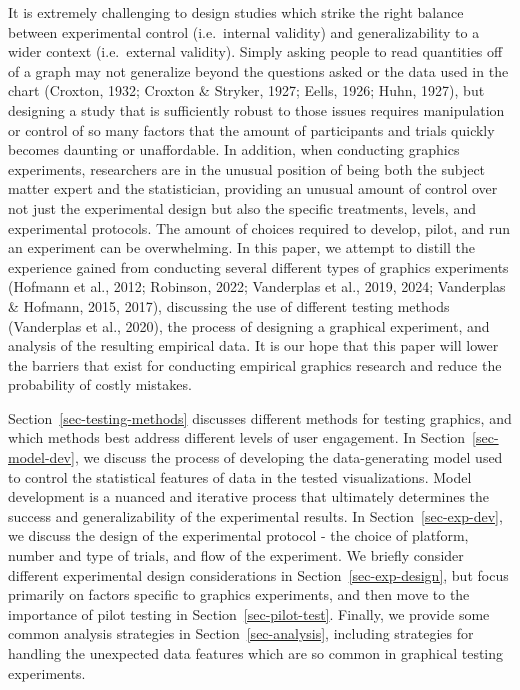\documentclass[
  10pt,
  letterpaper,
  DIV=11,
  numbers=noendperiod]{scrartcl}
\begin{document}
It is extremely challenging to design studies which strike the right
balance between experimental control (i.e.~internal validity) and
generalizability to a wider context (i.e.~external validity). Simply
asking people to read quantities off of a graph may not generalize
beyond the questions asked or the data used in the chart (Croxton, 1932;
Croxton \& Stryker, 1927; Eells, 1926; Huhn, 1927), but designing a
study that is sufficiently robust to those issues requires manipulation
or control of so many factors that the amount of participants and trials
quickly becomes daunting or unaffordable. In addition, when conducting
graphics experiments, researchers are in the unusual position of being
both the subject matter expert and the statistician, providing an
unusual amount of control over not just the experimental design but also
the specific treatments, levels, and experimental protocols. The amount
of choices required to develop, pilot, and run an experiment can be
overwhelming. In this paper, we attempt to distill the experience gained
from conducting several different types of graphics experiments (Hofmann
et al., 2012; Robinson, 2022; Vanderplas et al., 2019, 2024; Vanderplas
\& Hofmann, 2015, 2017), discussing the use of different testing methods
(Vanderplas et al., 2020), the process of designing a graphical
experiment, and analysis of the resulting empirical data. It is our hope
that this paper will lower the barriers that exist for conducting
empirical graphics research and reduce the probability of costly
mistakes.

Section~\ref{sec-testing-methods} discusses different methods for
testing graphics, and which methods best address different levels of
user engagement. In Section~\ref{sec-model-dev}, we discuss the process
of developing the data-generating model used to control the statistical
features of data in the tested visualizations. Model development is a
nuanced and iterative process that ultimately determines the success and
generalizability of the experimental results. In
Section~\ref{sec-exp-dev}, we discuss the design of the experimental
protocol - the choice of platform, number and type of trials, and flow
of the experiment. We briefly consider different experimental design
considerations in Section~\ref{sec-exp-design}, but focus primarily on
factors specific to graphics experiments, and then move to the
importance of pilot testing in Section~\ref{sec-pilot-test}. Finally, we
provide some common analysis strategies in Section~\ref{sec-analysis},
including strategies for handling the unexpected data features which are
so common in graphical testing experiments.
\end{document}
